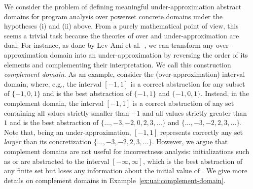 We consider the problem of defining meaningful under-approximation abstract domains for program analysis over powerset concrete domains under the hypotheses (i) and (ii) above.
%			
%			
From a purely mathematical point of view, this seems a trivial task because the theories of over and under-approximation are dual.
For instance, as done by Lev-Ami et al.~\cite{LSRG07}, we can transform any over-approximation domain into an under-approximation by reversing the order of its elements and complementing their interpretation. We call this construction \emph{complement domain}.
As an example, consider the (over-approximation) interval domain, where, e.g., the interval $[-1,1]$ is a correct abstraction for any subset of $\{ -1, 0, 1 \}$ and is the best abstraction of $\{ -1, 1 \}$ and $\{ -1, 0, 1 \}$. Instead, in the complement domain, the interval $[-1,1]$ is a correct abstraction of any set containing all values strictly smaller than $-1$ and all values strictly greater than $1$ and is the best abstraction of $\{ \dots, -3, -2, 0, 2, 3, \dots \}$ and $\{ \dots, -3, -2, 2, 3, \dots \}$. Note that, being an under-approximation, $[-1, 1]$ represents correctly any set \emph{larger} than its concretization $\{ \dots, -3, -2, 2, 3, \dots \}$.
However, we argue that complement domains are not useful for incorrectness analysis: initializations such as  or  are abstracted to the interval $[-\infty,\infty]$, which is the best abstraction of any finite set but loses any information about the initial value of . We give more details on complement domains in Example~\ref{ex:uai:complement-domain}.

